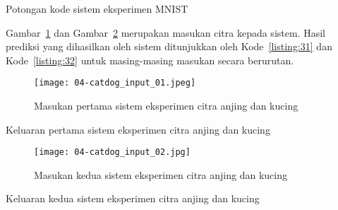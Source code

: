 \begin{code}
	\caption{Potongan kode sistem eksperimen MNIST}\label{listing:30}
\end{code}

Gambar~\ref{fig:04-catdog-input-01} dan Gambar~\ref{fig:04-catdog-input-02} merupakan masukan citra kepada sistem.
Hasil prediksi yang dihasilkan oleh sistem ditunjukkan oleh Kode~\ref{listing:31} dan Kode~\ref{listing:32} untuk masing-masing masukan secara berurutan.

\begin{figure}[H]
  \vspace{\baselineskip}
    \centering
    \texttt{[image: 04-catdog\_input\_01.jpeg]}
	\caption{Masukan pertama sistem eksperimen citra anjing dan kucing}\label{fig:04-catdog-input-01}
\end{figure}

\begin{code}
	\caption{Keluaran pertama sistem eksperimen citra anjing dan kucing}\label{listing:31}
\end{code}

\begin{figure}[H]
  \vspace{\baselineskip}
    \centering
	\texttt{[image: 04-catdog\_input\_02.jpg]}
	\caption{Masukan kedua sistem eksperimen citra anjing dan kucing}\label{fig:04-catdog-input-02}
\end{figure}

\begin{code}
	\caption{Keluaran kedua sistem eksperimen citra anjing dan kucing}\label{listing:32}
\end{code}